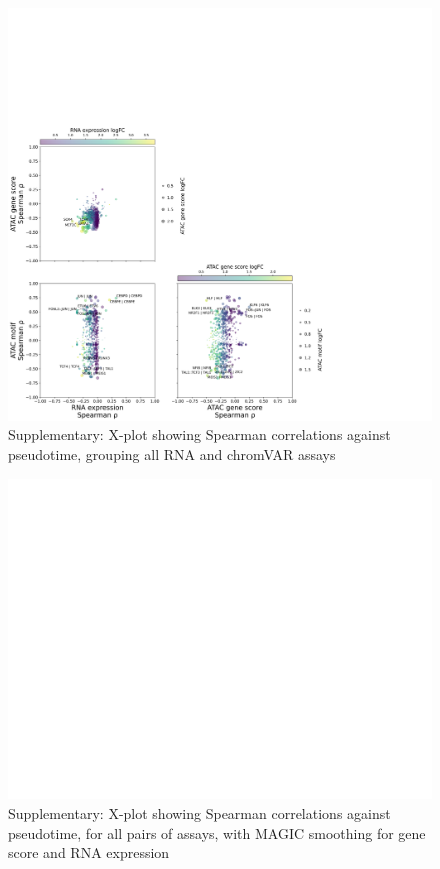 \documentclass[a4paper]{article}
\begin{document}
\begin{figure}[!htb]
  \centering
  \includegraphics[width=\textwidth]{../figures/hematopoiesis/Neutrophil_40_106_smooth_none_grouped_X_plot.png}
  \caption{Supplementary: X-plot showing Spearman correlations against pseudotime, grouping all RNA and chromVAR assays}
\end{figure}


\begin{figure}[!htb]
  \centering
  \includegraphics[width=\textwidth]{../figures/hematopoiesis/Neutrophil_40_106_smooth_magic_detailed_X_plot.png}
  \caption{Supplementary: X-plot showing Spearman correlations against pseudotime, for all pairs of assays, with MAGIC smoothing for gene score and RNA expression}
\end{figure}
\end{document}
